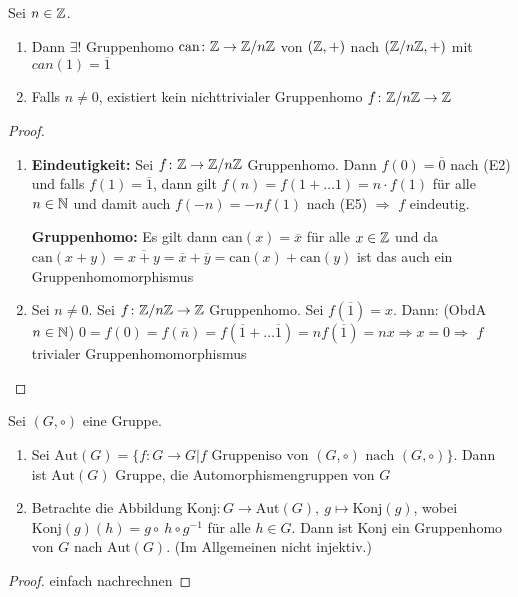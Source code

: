 \documentclass[12pt,a4paper]{scrartcl}
\begin{document}
\begin{lem}
	Sei $n\in \mathbb Z$.
	\begin{enumerate}
		\item Dann $\exists!$ Gruppenhomo $\mbox{can}\colon \mathbb Z\to \mathbb Z/n\mathbb Z$ von $(\mathbb Z,+)$ nach $(\mathbb Z/n\mathbb Z,+)$ mit $can(1)=\overline{1}$
		\item Falls $n\neq 0$, existiert kein nichttrivialer Gruppenhomo $f\colon \mathbb Z/n\mathbb Z\to\mathbb Z$ 
	\end{enumerate}
\end{lem}
\begin{proof}
	\leavevmode
	\begin{enumerate}
		\item
	\textbf{Eindeutigkeit:} Sei $f\colon \mathbb Z\to \mathbb Z/n\mathbb Z$ Gruppenhomo. Dann $f(0)=\overline{0}$ nach (E2) und falls $f(1) = \overline{1}$, dann gilt $f(n)= f(1+\dots 1) = n\cdot f(1)$ für alle $n\in\mathbb N$ und damit auch $f(-n) = -nf(1)$ nach (E5) $\Rightarrow$ $f$ eindeutig.
	
	\noindent \textbf{Gruppenhomo:} Es gilt dann $\text{can}(x) = \overline{x}$ für alle $x\in\mathbb Z$ und da $\text{can}(x+y) = \overline{x+y} = \overline{x}+\overline{y} = \text{can}(x)+\text{can}(y)$ ist das auch ein Gruppenhomomorphismus
	
	\item Sei $n\neq 0$. Sei $f\colon \mathbb Z/n\mathbb Z\to \mathbb Z$ Gruppenhomo. Sei $f(\overline{1})= x$. Dann: (ObdA $n\in\mathbb N$) $0=f(0)=f(\overline{n})= f(\overline{1}+\dots \overline{1})=nf(\overline{1})= nx\Rightarrow x=0\Rightarrow$ $f$ trivialer Gruppenhomomorphismus
	\end{enumerate}
\end{proof}

\begin{lem}
	Sei $(G,\circ)$ eine Gruppe.
	\begin{enumerate}
		\item Sei $\text{Aut}(G) = \{f\colon G\to G| f \text{ Gruppeniso von $(G,\circ)$ nach }(G,\circ)\}$. Dann ist $\text{Aut}(G)$ Gruppe, die Automorphismengruppen von $G$
		\item Betrachte die Abbildung $\text{Konj}\colon G\to \text{Aut}(G) ,\ g\mapsto \text{Konj}(g)$, wobei $\text{Konj}(g)(h)= g\circ\ h\circ g^{-1}$ für alle $h\in G$. Dann ist Konj ein Gruppenhomo von $G$ nach $\text{Aut}(G)$. (Im Allgemeinen nicht injektiv.)
	\end{enumerate}
\end{lem}

\begin{proof}
	einfach nachrechnen
\end{proof}
\end{document}
